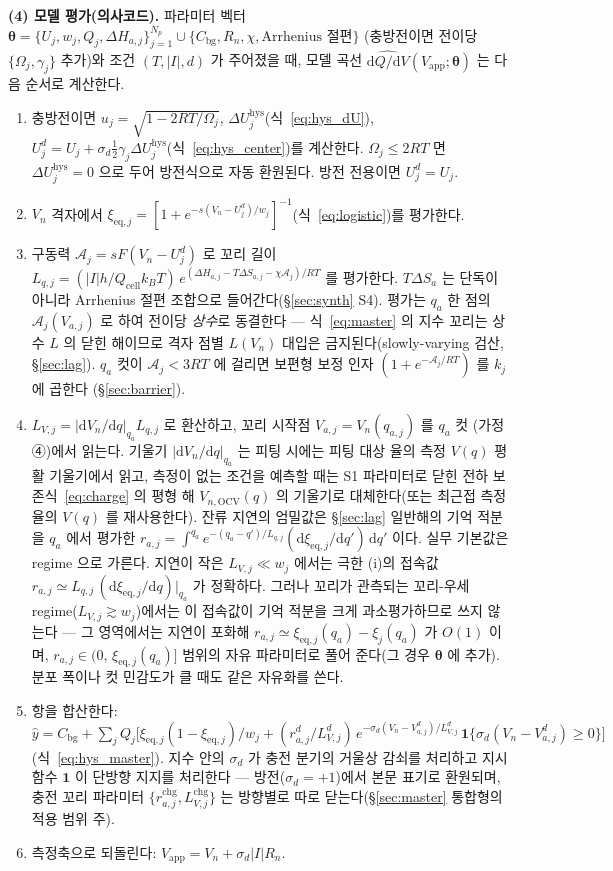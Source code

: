 \documentclass[11pt,a4paper]{article}
\newcommand{\dd}{\mathrm{d}}
\newcommand{\eq}{\mathrm{eq}}
\newcommand{\app}{\mathrm{app}}
\newcommand{\cell}{\mathrm{cell}}
\newcommand{\bg}{\mathrm{bg}}
\newcommand{\OCV}{\mathrm{OCV}}
\newcommand{\chg}{\mathrm{chg}}
\newcommand{\hys}{\mathrm{hys}}
\begin{document}
\textbf{(4) 모델 평가(의사코드).} 파라미터 벡터
$\bm\theta=\{U_j,w_j,Q_j,\Delta H_{a,j}\}_{j=1}^{N_p}\cup\{C_\bg,R_n,\chi,\text{Arrhenius 절편}\}$
(충방전이면 전이당 $\{\Omega_j,\gamma_j\}$ 추가)와 조건 $(T,|I|,d)$ 가 주어졌을 때, 모델 곡선
$\widehat{\dd Q/\dd V}(V_\app;\bm\theta)$ 는 다음 순서로 계산한다.
\begin{enumerate}[label=\textbf{M\arabic*.},leftmargin=2.4em,itemsep=1pt]
\item 충방전이면 $u_j=\sqrt{1-2RT/\Omega_j}$, $\Delta U_j^\hys$(식~\eqref{eq:hys_dU}),
  $U_j^d=U_j+\sigma_d\tfrac12\gamma_j\Delta U_j^\hys$(식~\eqref{eq:hys_center})를 계산한다.
  $\Omega_j\le2RT$ 면 $\Delta U_j^\hys=0$ 으로 두어 방전식으로 자동 환원된다. 방전 전용이면 $U_j^d=U_j$.
\item $V_n$ 격자에서 $\xi_{\eq,j}=[1+e^{-s(V_n-U_j^d)/w_j}]^{-1}$(식~\eqref{eq:logistic})를 평가한다.
\item 구동력 $\mathcal A_j=sF(V_n-U_j^d)$ 로 꼬리 길이
  $L_{q,j}=(|I|h/Q_\cell k_BT)\,e^{(\Delta H_{a,j}-T\Delta S_{a,j}-\chi\mathcal A_j)/RT}$ 를 평가한다.
  $T\Delta S_a$ 는 단독이 아니라 Arrhenius 절편 조합으로 들어간다(\S\ref{sec:synth} S4). 평가는 $q_a$ 한 점의
  $\mathcal A_j(V_{a,j})$ 로 하여 전이당 \emph{상수}로 동결한다 — 식~\eqref{eq:master} 의 지수 꼬리는 상수
  $L$ 의 닫힌 해이므로 격자 점별 $L(V_n)$ 대입은 금지된다(slowly-varying 검산, \S\ref{sec:lag}). $q_a$ 컷이
  $\mathcal A_j<3RT$ 에 걸리면 보편형 보정 인자 $(1+e^{-\mathcal A_j/RT})$ 를 $k_j$ 에 곱한다
  (\S\ref{sec:barrier}).
\item $L_{V,j}=|\dd V_n/\dd q|_{q_a}L_{q,j}$ 로 환산하고, 꼬리 시작점 $V_{a,j}=V_n(q_{a,j})$ 를 $q_a$ 컷
  (가정 ④)에서 읽는다. 기울기 $|\dd V_n/\dd q|_{q_a}$ 는 피팅 시에는 피팅 대상 율의 측정 $V(q)$ 평활
  기울기에서 읽고, 측정이 없는 조건을 예측할 때는 S1 파라미터로 닫힌 전하 보존식~\eqref{eq:charge} 의 평형 해
  $V_{n,\OCV}(q)$ 의 기울기로 대체한다(또는 최근접 측정 율의 $V(q)$ 를 재사용한다). 잔류 지연의 엄밀값은 \S\ref{sec:lag} 일반해의 기억 적분을 $q_a$ 에서 평가한
  $r_{a,j}=\int^{q_a}e^{-(q_a-q')/L_{q,j}}(\dd\xi_{\eq,j}/\dd q')\,\dd q'$ 이다. 실무 기본값은 regime
  으로 가른다. 지연이 작은 $L_{V,j}\ll w_j$ 에서는 극한 (i)의 접속값
  $r_{a,j}\simeq L_{q,j}\,(\dd\xi_{\eq,j}/\dd q)\big|_{q_a}$ 가 정확하다. 그러나 꼬리가 관측되는 꼬리-우세
  regime($L_{V,j}\gtrsim w_j$)에서는 이 접속값이 기억 적분을 크게 과소평가하므로 쓰지 않는다 — 그 영역에서는
  지연이 포화해 $r_{a,j}\simeq\xi_{\eq,j}(q_a)-\xi_j(q_a)$ 가 $O(1)$ 이며, $r_{a,j}\in(0,\,\xi_{\eq,j}(q_a)]$
  범위의 자유 파라미터로 풀어 준다(그 경우 $\bm\theta$ 에 추가). 분포 폭이나 컷 민감도가 클 때도 같은 자유화를
  쓴다.
\item 항을 합산한다: $\widehat y=C_\bg+\sum_jQ_j\big[\xi_{\eq,j}(1-\xi_{\eq,j})/w_j
  +(r_{a,j}^d/L_{V,j}^d)\,e^{-\sigma_d(V_n-V_{a,j}^d)/L_{V,j}^d}\,\mathbf 1\{\sigma_d(V_n-V_{a,j}^d)\ge0\}\big]$
  (식~\eqref{eq:hys_master}). 지수 안의 $\sigma_d$ 가 충전 분기의 거울상 감쇠를 처리하고 지시함수
  $\mathbf 1$ 이 단방향 지지를 처리한다 — 방전($\sigma_d=+1$)에서 본문 표기로 환원되며, 충전 꼬리 파라미터
  $\{r_{a,j}^\chg,L_{V,j}^\chg\}$ 는 방향별로 따로 닫는다(\S\ref{sec:master} 통합형의 적용 범위 주).
\item 측정축으로 되돌린다: $V_\app=V_n+\sigma_d|I|R_n$.
\end{enumerate}
\end{document}
